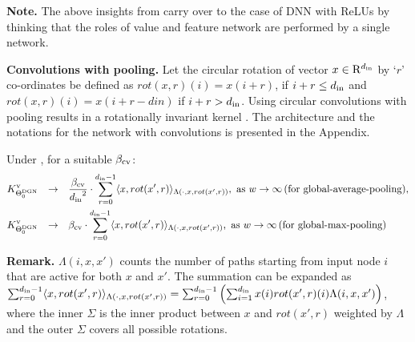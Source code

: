 \textbf{Note.} The above insights from  carry over to the case of DNN with ReLUs by thinking that the roles of value and feature network are performed by a single network.

\textbf{Convolutions with pooling.} Let the circular rotation of vector $x\in\mathrm{R}^{d_{\text{in}}}$ by `$r$' co-ordinates be defined as $rot(x,r)(i)=x(i+ r)$, if $i+r \leq d_{\text{in}}$ and $rot(x,r)(i)=x(i+ r-din)$ if $i+r > d_{\text{in}}$. Using circular convolutions with pooling results in a rotationally invariant kernel . The architecture and the notations for the network with convolutions is presented in the Appendix.

\begin{theorem}\label{th:mainconv} Under , for  a suitable $\beta_{\text{cv}}$:
\begin{align*}
&K^{\text{v}}_{\Theta^{\text{DGN}}_0}&\rightarrow&\quad \frac{\beta_{\text{cv}}}{{d_{\text{in}}}^2} \cdot \sum_{r=0}^{d_{\text{in}}-1} \langle x,rot(x',r)\rangle_{\Lambda(\cdot, x,rot(x',r))},\,\, \text{as}\,\,  w\rightarrow\infty\,\text{(for global-average-pooling)}, \\
&K^{\text{v}}_{\Theta^{\text{DGN}}_0}&\rightarrow& \quad{\beta_{\text{cv}}} \cdot \sum_{r=0}^{d_{\text{in}}-1} \langle x,rot(x',r)\rangle_{\Lambda(\cdot, x,rot(x',r))},\,\, \text{as}\,\,  w\rightarrow\infty\,\text{(for global-max-pooling)}
\end{align*}
\end{theorem}
\textbf{Remark.}  $\Lambda(i,x,x')$ counts the number of paths starting from input node $i$ that are active for both $x$ and $x'$. The summation can be expanded as $\sum_{r=0}^{d_{\text{in}}-1} \langle x,rot(x',r)\rangle_{\Lambda(\cdot, x,rot(x',r))}=\sum_{r=0}^{d_{\text{in}}-1} \left(\sum_{i=1}^{d_{\text{in}}} x(i) rot(x',r)(i)\Lambda(i,x,x')\right)$, where the inner $\Sigma$ is the inner product between $x$ and $rot(x',r)$ weighted by $\Lambda$ and the outer $\Sigma$ covers all possible rotations.

